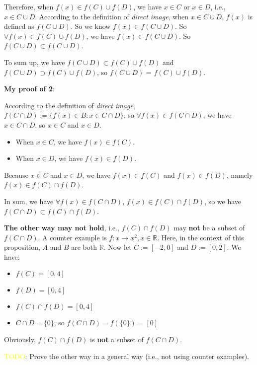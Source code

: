 \documentclass[12pt, letterpaper, oneside]{book}
\begin{document}
Therefore, when $f(x) \in f(C) \cup f(D)$, we have $x \in C$ or $x \in D$, i.e.,
$x \in C \cup D$. According to the definition of \textit{direct image}, when $x
  \in C \cup D$, $f(x)$ is defined as $f(C \cup D)$. So we know $f(x) \in f(C
  \cup D)$. So $\forall f(x) \in f(C) \cup f(D)$, we have $f(x) \in f(C \cup D)$.
So $f(C \cup D) \subset f(C \cup D)$.

To sum up, we have $f(C \cup D) \subset f(C) \cup f(D)$ and $f(C \cup D)
  \supset f(C) \cup f(D)$, so $f(C \cup D)$ = $f(C) \cup f(D)$.

\textbf{My proof of 2}:

According to the definition of \textit{direct image}, $f(C \cap D) := \{f(x)
  \in B: x \in C \cap D\}$, so $\forall f(x) \in f(C \cap D)$, we have $x \in C
  \cap D$, so $x \in C$ and $x \in D$.

\begin{itemize}
  \item When $x \in C$, we have $f(x) \in f(C)$.
  \item When $x \in D$, we have $f(x) \in f(D)$.
\end{itemize}

Because $x \in C$ and $x \in D$, we have $f(x) \in f(C)$ and $f(x) \in f(D)$,
namely $f(x) \in f(C) \cap f(D)$.

In sum, we have $\forall f(x) \in f(C \cap D)$, $f(x) \in f(C) \cap f(D)$, so
we have $f(C \cap D) \subset f(C) \cap f(D)$.

\textbf{The other way may not hold}, i.e., $f(C) \cap f(D)$ may \textbf{not} be
a subset of $f(C \cap D)$. A counter example is $f: x \rightarrow x^2, x \in
  \mathbb{R}$. Here, in the context of this proposition, $A$ and $B$ are both
$\mathbb{R}$. Now let $C := [-2, 0]$ and $D := [0, 2]$. We have:

\begin{itemize}
  \item $f(C) = [0, 4]$
  \item $f(D) = [0, 4]$
  \item $f(C) \cap f(D) = [0, 4]$
  \item $C \cap D = \{0\}$, so $f(C \cap D) = f(\{0\}) = [0]$
\end{itemize}

Obviously, $f(C) \cap f(D)$ is \textbf{not} a subset of $f(C \cap D)$.

\colorbox{red!100}{\textcolor{yellow}{TODO}}: Prove the other way in a general
way (i.e., not using counter examples).

\end{document}
